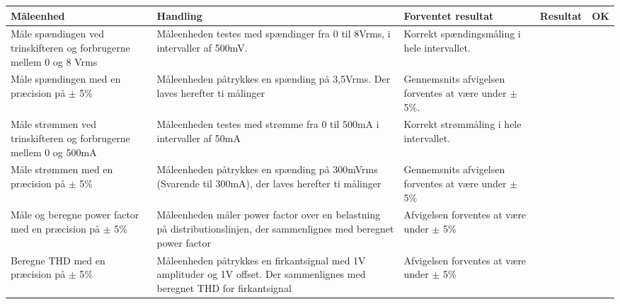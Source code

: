 	\begin{longtable}{|p{4cm}|p{3cm}|p{3cm}|p{3cm}|p{1cm}|}
		\hline
		\textbf{Måleenhed} & \textbf{Handling} & \textbf{Forventet resultat} & \textbf{Resultat} &\textbf{OK} \\\hline
		Måle spændingen ved trinskifteren og forbrugerne mellem 0 og 8 Vrms & Måleenheden testes med spændinger fra 0 til 8Vrms, i intervaller af 500mV. & Korrekt spændingsmåling i hele intervallet. & & \\\hline
		Måle spændingen med en præcision på $\pm$ 5\%& Måleenheden påtrykkes en spænding på 3,5Vrms. Der laves herefter ti målinger& Gennemsnits afvigelsen forventes at være under $\pm$5\%.&  & \\\hline
		Måle strømmen ved trinskifteren og forbrugerne mellem 0 og 500mA& Måleenheden testes med strømme fra 0 til 500mA i intervaller af 50mA&Korrekt strømmåling i hele intervallet.& & \\\hline
		Måle strømmen med en præcision på $\pm$ 5\%&Måleenheden påtrykkes en spænding på 300mVrms (Svarende til 300mA), der laves herefter ti målinger&Gennemsnits afvigelsen forventes at være under $\pm$5\%& & \\\hline
		Måle og beregne power factor med en præcision på $\pm$ 5$\%$&Måleenheden måler power factor over en belastning på distributionslinjen, der sammenlignes med beregnet power factor&Afvigelsen forventes at være under $\pm$ 5\% & & \\\hline
		Beregne THD med en præcision på $\pm$ 5$\%$&Måleenheden påtrykkes en firkantsignal med 1V amplituder og 1V offset. Der sammenlignes med beregnet THD for firkantsignal& Afvigelsen forventes at være under $\pm$ 5\%& & \\\hline
			
	\end{longtable}
	
	
